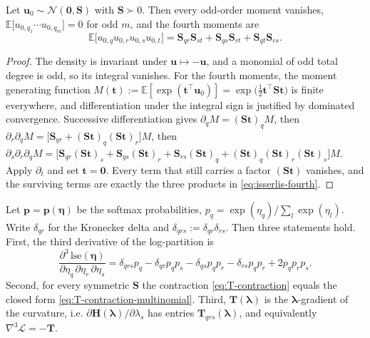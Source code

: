 \begin{lemma}
Let $\bm{u}_{0}\sim\mathcal{N}(\bm{0},\mathbf{S})$ with $\mathbf{S}\succ0$. Then every odd-order moment vanishes, $\mathbb{E}\big[u_{0,q_{1}}\cdots u_{0,q_{m}}\big]=0$ for odd $m$, and the fourth moments are
\begin{equation}
    \mathbb{E}\big[u_{0,q}u_{0,r}u_{0,s}u_{0,t}\big]=\mathbf{S}_{qr}\mathbf{S}_{st}+\mathbf{S}_{qs}\mathbf{S}_{rt}+\mathbf{S}_{qt}\mathbf{S}_{rs}.
    \label{eq:isserlis-fourth}
\end{equation}
\label{lem:gaussian-moments}
\end{lemma}

\begin{proof}
The density is invariant under $\bm{u}\mapsto-\bm{u}$, and a monomial of odd total degree is odd, so its integral vanishes. For the fourth moments, the moment generating function $M(\bm{t}):=\mathbb{E}[\exp(\bm{t}^{\top}\bm{u}_{0})]=\exp\big(\frac{1}{2}\bm{t}^{\top}\mathbf{S}\bm{t}\big)$ is finite everywhere, and differentiation under the integral sign is justified by dominated convergence. Successive differentiation gives $\partial_{q}M=(\mathbf{S}\bm{t})_{q}M$, then $\partial_{r}\partial_{q}M=\big[\mathbf{S}_{qr}+(\mathbf{S}\bm{t})_{q}(\mathbf{S}\bm{t})_{r}\big]M$, then $\partial_{s}\partial_{r}\partial_{q}M=\big[\mathbf{S}_{qr}(\mathbf{S}\bm{t})_{s}+\mathbf{S}_{qs}(\mathbf{S}\bm{t})_{r}+\mathbf{S}_{rs}(\mathbf{S}\bm{t})_{q}+(\mathbf{S}\bm{t})_{q}(\mathbf{S}\bm{t})_{r}(\mathbf{S}\bm{t})_{s}\big]M$. Apply $\partial_{t}$ and set $\bm{t}=\bm{0}$. Every term that still carries a factor $(\mathbf{S}\bm{t})$ vanishes, and the surviving terms are exactly the three products in \eqref{eq:isserlis-fourth}.
\end{proof}

\begin{lemma}
Let $\bm{p}=\bm{p}(\bm{\eta})$ be the softmax probabilities, $p_{q}=\exp(\eta_{q})/\sum_{l}\exp(\eta_{l})$. Write $\delta_{qr}$ for the Kronecker delta and $\delta_{qrs}:=\delta_{qr}\delta_{rs}$. Then three statements hold. First, the third derivative of the log-partition is
\begin{equation}
    \frac{\partial^{3}\,\mathrm{lse}(\bm{\eta})}{\partial\eta_{q}\,\partial\eta_{r}\,\partial\eta_{s}}=\delta_{qrs}p_{q}-\delta_{qr}p_{q}p_{s}-\delta_{qs}p_{q}p_{r}-\delta_{rs}p_{q}p_{r}+2p_{q}p_{r}p_{s}.
    \label{eq:lse-third}
\end{equation}
Second, for every symmetric $\mathbf{S}$ the contraction \eqref{eq:T-contraction} equals the closed form \eqref{eq:T-contraction-multinomial}. Third, $\mathbf{T}(\bm{\lambda})$ is the $\bm{\lambda}$-gradient of the curvature, i.e. $\partial\mathbf{H}(\bm{\lambda})/\partial\lambda_{s}$ has entries $\mathbf{T}_{qrs}(\bm{\lambda})$, and equivalently $\nabla^{3}\mathcal{L}=-\mathbf{T}$.
\label{lem:T-closed-form}
\end{lemma}

